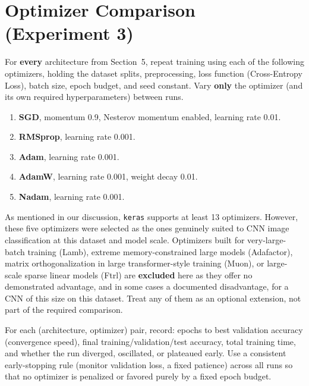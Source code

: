 \documentclass[12pt,a4paper]{article}
\begin{document}
\section{Optimizer Comparison (Experiment 3)}

For \textbf{every} architecture from Section~5, repeat training using each of the
following optimizers, holding the dataset splits, preprocessing, loss function
(Cross-Entropy Loss), batch size, epoch budget, and seed constant. Vary \textbf{only}
the optimizer (and its own required hyperparameters) between runs.

\begin{enumerate}[leftmargin=*, label=\arabic*.]
  \item \textbf{SGD}, momentum 0.9, Nesterov momentum enabled, learning rate 0.01.
  \item \textbf{RMSprop}, learning rate 0.001.
  \item \textbf{Adam}, learning rate 0.001.
  \item \textbf{AdamW}, learning rate 0.001, weight decay 0.01.
  \item \textbf{Nadam}, learning rate 0.001.
\end{enumerate}

\begin{notebox}
As mentioned in our discussion, \texttt{keras} supports at least 13 optimizers. However, these five optimizers were selected as the ones genuinely suited to CNN image
classification at this dataset and model scale. Optimizers built for very-large-batch
training (Lamb), extreme memory-constrained large models (Adafactor), matrix
orthogonalization in large transformer-style training (Muon), or large-scale sparse
linear models (Ftrl) are \textbf{excluded} here as they offer no demonstrated advantage,
and in some cases a documented disadvantage, for a CNN of this size on this dataset.
Treat any of them as an optional extension, not part of the required comparison.
\end{notebox}

\begin{stepbox}
For each (architecture, optimizer) pair, record: epochs to best validation accuracy
(convergence speed), final training/validation/test accuracy, total training time,
and whether the run diverged, oscillated, or plateaued early. Use a consistent
early-stopping rule (monitor validation loss, a fixed patience) across all runs so that
no optimizer is penalized or favored purely by a fixed epoch budget.
\end{stepbox}
\end{document}
